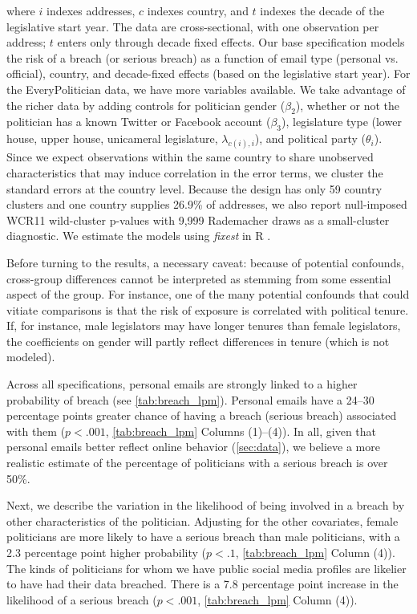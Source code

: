\documentclass[12pt, letterpaper]{article}
\begin{document}
where $i$ indexes addresses, $c$ indexes country, and $t$ indexes the decade of the legislative start year. The data are cross-sectional, with one observation per address; $t$ enters only through decade fixed effects. Our base specification models the risk of a breach (or serious breach) as a function of email type (personal vs. official), country, and decade-fixed effects (based on the legislative start year). For the EveryPolitician data, we have more variables available. We take advantage of the richer data by adding controls for politician gender ($\beta_2$), whether or not the politician has a known Twitter or Facebook account ($\beta_3$), legislature type (lower house, upper house, unicameral legislature, $\lambda_{c(i), i}$), and political party ($\theta_i$). Since we expect observations within the same country to share unobserved characteristics that may induce correlation in the error terms, we cluster the standard errors at the country level. Because the design has only 59 country clusters and one country supplies 26.9\% of addresses, we also report null-imposed WCR11 wild-cluster p-values with 9,999 Rademacher draws as a small-cluster diagnostic. We estimate the models using \textit{fixest} in R \citep{fixest}.

Before turning to the results, a necessary caveat: because of potential confounds, cross-group differences cannot be interpreted as stemming from some essential aspect of the group. For instance, one of the many potential confounds that could vitiate comparisons is that the risk of exposure is correlated with political tenure. If, for instance, male legislators may have longer tenures than female legislators, the coefficients on gender will partly reflect differences in tenure (which is not modeled).



Across all specifications, personal emails are strongly linked to a higher probability of breach (see \cref{tab:breach_lpm}). Personal emails have a 24--30 percentage points greater chance of having a breach (serious breach) associated with them ($p < .001$, \cref{tab:breach_lpm} Columns (1)--(4)). In all, given that personal emails better reflect online behavior (\cref{sec:data}), we believe a more realistic estimate of the percentage of politicians with a serious breach is over 50\%.

Next, we describe the variation in the likelihood of being involved in a breach by other characteristics of the politician. Adjusting for the other covariates, female politicians are more likely to have a serious breach than male politicians, with a 2.3 percentage point higher probability ($p < .1$, \cref{tab:breach_lpm} Column (4)). The kinds of politicians for whom we have public social media profiles are likelier to have had their data breached. There is a 7.8 percentage point increase in the likelihood of a serious breach ($p < .001$, \cref{tab:breach_lpm} Column (4)).
\end{document}
